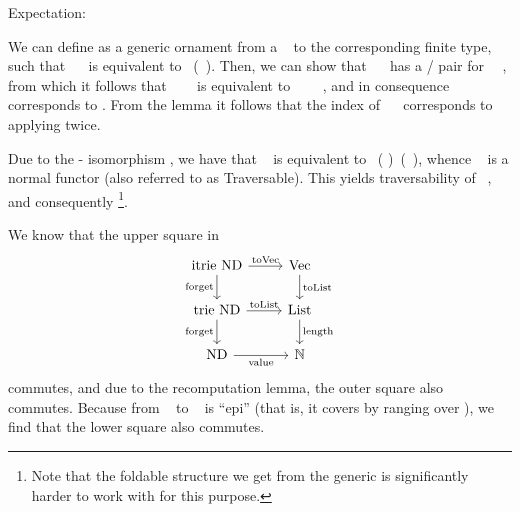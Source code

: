 Expectation:

We can define  as a generic ornament from a \  to the corresponding finite type, such that \ \  is equivalent to \ (\ ). Then, we can show that \ \  has a / pair for \ \ , from which it follows that \ \ \  is equivalent to \ \ \ \ , and in consequence \  corresponds to . From the  lemma it follows that the index  of \ \  corresponds to applying  twice.

Due to the - isomorphism \cite{algorn}, we have that \  is equivalent to \ ( )\ (\ ), whence \  is a normal functor (also referred to as Traversable). This yields traversability of \ , and consequently \footnote{Note that the foldable structure we get from the generic  is significantly harder to work with for this purpose.}. 

We know that the upper square in
\[\begin{tikzcd}
	{\mathrm{itrie}\ \mathrm{ND}} & {\mathrm{Vec}} \\
	{\mathrm{trie}\ \mathrm{ND}} & {\mathrm{List}} \\
	{\mathrm{ND}} & {\mathbb{N}}
	\arrow["{\mathrm{toList}}", from=2-1, to=2-2]
	\arrow["{\mathrm{forget}}"', from=1-1, to=2-1]
	\arrow["{\mathrm{toVec}}", from=1-1, to=1-2]
	\arrow["{\mathrm{toList}}", from=1-2, to=2-2]
	\arrow["{\mathrm{value}}"', from=3-1, to=3-2]
	\arrow["{\mathrm{forget}}"', from=2-1, to=3-1]
	\arrow["{\mathrm{length}}", from=2-2, to=3-2]
\end{tikzcd}\]
commutes, and due to the recomputation lemma, the outer square also commutes. Because  from \  to \  is ``epi'' (that is, it covers by ranging over ), we find that the lower square also commutes.

